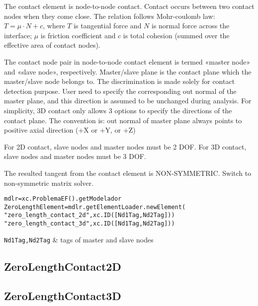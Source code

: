 The contact element is node-to-node contact. Contact occurs between two contact nodes when they come close. The relation follows Mohr-coulomb law: $T = \mu \cdot N + c$, where $T$ is tangential force and $N$ is normal force across the interface; $\mu$ is friction coefficient and $c$ is total cohesion (summed over the effective area of contact nodes).

The contact node pair in node-to-node contact element is termed «master node» and «slave node», respectively. Master/slave plane is the contact plane which the master/slave node belongs to. The discrimination is made solely for contact detection purpose. User need to specify the corresponding out normal of the master plane, and this direction is assumed to be unchanged during analysis. For simplicity, 3D contact only allows 3 options to specify the directions of the contact plane. The convention is: out normal of master plane always points to positive axial direction (+X or +Y, or +Z)

For 2D contact, slave nodes and master nodes must be 2 DOF. For 3D contact, slave nodes and master nodes must be 3 DOF.

The resulted tangent from the contact element is NON-SYMMETRIC. Switch to non-symmetric matrix solver. 

\begin{verbatim}
mdlr=xc.ProblemaEF().getModelador
ZeroLengthElement=mdlr.getElementLoader.newElement(
"zero_length_contact_2d",xc.ID([Nd1Tag,Nd2Tag]))
"zero_length_contact_3d",xc.ID([Nd1Tag,Nd2Tag]))
\end{verbatim}
\begin{paramFuncTable}
{\tt Nd1Tag,Nd2Tag} & tags of master and slave nodes\\
\end{paramFuncTable}


\begin{paramClassTable}
\ElementParam{}
\ElementZERODParam{}
\end{paramClassTable}

\begin{methodsTable}
\ElementMeth{}
\ElementZERODMeth{}
\ZeroLengthSectionMeth{}
\end{methodsTable}

\subsection{ZeroLengthContact2D}


\subsection{ZeroLengthContact3D}

